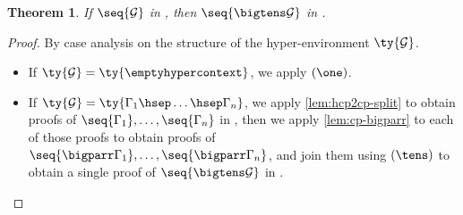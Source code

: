 \documentclass[submission,copyright,creativecommons]{eptcs}
\newtheorem{theorem}{Theorem}
\begin{document}
\begin{theorem}\label{thm:hcp2cp-bigtens}
  If $\seq{\mathcal{G}}$ in \hcp, then $\seq{\bigtens\mathcal{G}}$ in \cp.
\end{theorem}
\begin{proof}
  By case analysis on the structure of the hyper-environment $\ty{\mathcal{G}}$.
  \begin{itemize}
  \item
    If $\ty{\mathcal{G}} = \ty{\emptyhypercontext}$, we apply $(\one)$.
  \item
    If $\ty{\mathcal{G}} = \ty{\Gamma_1 \hsep \dots \hsep \Gamma_n}$,
    we apply \cref{lem:hcp2cp-split} to obtain proofs of $\seq{\Gamma_1}, \dots,
    \seq{\Gamma_n}$ in \cp, then we apply \cref{lem:cp-bigparr} to each of
    those proofs to obtain proofs of $\seq{\bigparr\Gamma_1}, \dots,
    \seq{\bigparr\Gamma_n}$, and join them using $(\tens)$ to obtain a single
    proof of $\seq{\bigtens\mathcal{G}}$ in \cp.
  \end{itemize}
\end{proof}




\end{document}
